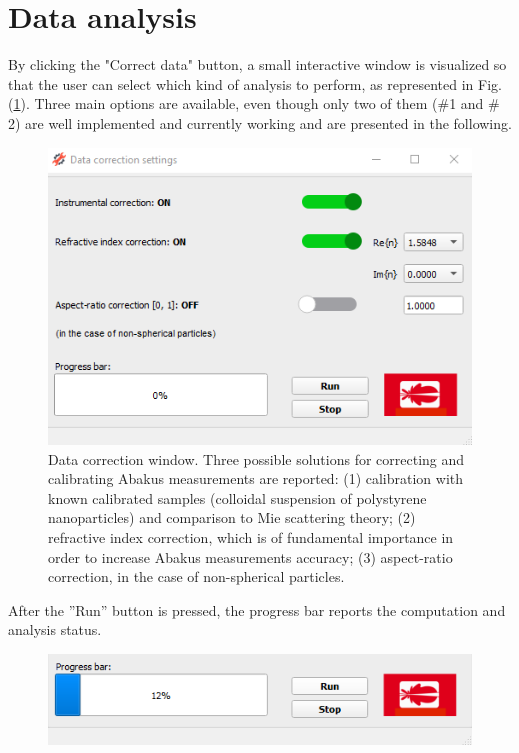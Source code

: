 \documentclass[a4paper, 11pt]{report}
\begin{document}


\newpage
\section{Data analysis}
\label{analysis_sect}

By clicking the "Correct data" button, a small interactive window is visualized so that the user can select which kind of analysis to perform, as represented in Fig.(\ref{correct_data}). Three main options are available, even though only two of them ($\#$1 and $\#$2) are well implemented and currently working and are presented in the following.

\begin{figure}[!htb]
	\centering	
	\includegraphics[scale=0.75]{correct_data.png}
	\caption{Data correction window. Three possible solutions for correcting and calibrating Abakus measurements are reported: (1) calibration with known calibrated samples (colloidal suspension of polystyrene nanoparticles) and comparison to Mie scattering theory; (2) refractive index correction, which is of fundamental importance in order to increase Abakus measurements accuracy; (3) aspect-ratio correction, in the case of non-spherical particles.}
	\label{correct_data}
\end{figure}
After the ''Run'' button is pressed, the progress bar reports the computation and analysis status.
\begin{figure}[!htb]
	\centering	
	\includegraphics[scale=0.75]{correct_data1.png}
\end{figure}
\end{document}
